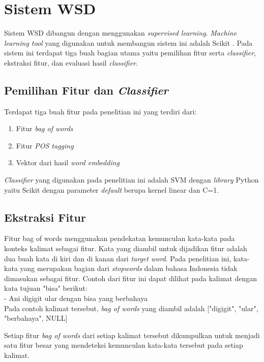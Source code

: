 \section{Sistem WSD}
Sistem WSD dibangun dengan menggunakan \textit{supervised learning}. \textit{Machine learning tool} yang digunakan untuk membangun sistem ini adalah Scikit \citep{scikit-learn}. Pada sistem ini terdapat tiga buah bagian utama yaitu pemilihan fitur serta \textit{classifier}, ekstraksi fitur, dan evaluasi hasil \textit{classifier}.

\subsection{Pemilihan Fitur dan \textit{Classifier}}
Terdapat tiga buah fitur pada penelitian ini yang terdiri dari:

\begin{enumerate}
	\item Fitur \textit{bag of words}
	\item Fitur \textit{POS tagging}
	\item Vektor dari hasil \textit{word embedding}
\end{enumerate}

\textit{Classifier} yang digunakan pada penelitian ini adalah SVM dengan \textit{library} Python yaitu Scikit dengan parameter \textit{default} berupa kernel linear dan C=1.

\subsection{Ekstraksi Fitur}
Fitur bag of words menggunakan pendekatan kemunculan kata-kata pada konteks kalimat sebagai fitur. Kata yang diambil untuk dijadikan fitur adalah dua buah kata di kiri dan di kanan dari \textit{target word}. Pada penelitian ini, kata-kata yang merupakan bagian dari \textit{stopwords} dalam bahasa Indonesia tidak dimasukan sebagai fitur. Contoh dari fitur ini dapat dilihat pada kalimat dengan kata tujuan "bisa" berikut:
\\
- Ani digigit ular dengan bisa yang berbahaya
\\
Pada contoh kalimat tersebut, \textit{bag of words} yang diambil adalah ["digigit", "ular", "berbahaya", NULL]

Setiap fitur \textit{bag of words} dari setiap kalimat tersebut dikumpulkan untuk menjadi satu fitur besar yang mendeteksi kemunculan kata-kata tersebut pada setiap kalimat.


